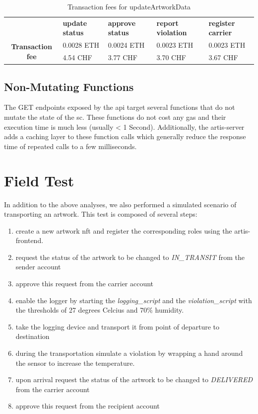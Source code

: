 \begin{table}[ht]
\begin{tabular}{cllll}
                                          & \textbf{update status} & \textbf{approve status} & \textbf{report violation} & \textbf{register carrier} \\ \cline{2-5} 
\multirow{2}{*}{\textbf{Transaction fee}} & 0.0028 ETH             & 0.0024 ETH          & 0.0023 ETH        & 0.0023 ETH       \\
                                          & 4.54 CHF               & 3.77 CHF            & 3.70 CHF          & 3.67 CHF       
\end{tabular}
\caption{Transaction fees for updateArtworkData}
\label{tab:updateArtworkData_tx_fees}
\end{table}


\subsection*{Non-Mutating Functions}
The GET endpoints exposed by the \gls{api} target several functions that do not mutate the state of the \gls{sc}. These functions do not cost any gas and their execution time is much less (usually < 1 Second). Additionally, the artis-server adds a caching layer to these function calls which generally reduce the response time of repeated calls to a few milliseconds. 

\section{Field Test}
In addition to the above analyses, we also performed a simulated scenario of transporting an artwork. This test is composed of several steps:

\begin{enumerate}
    \item create a new artwork \gls{nft} and register the corresponding roles using the artis-frontend.
    \item request the status of the artwork to be changed to \textit{IN\_TRANSIT} from the sender account
    \item approve this request from the carrier account
    \item enable the logger by starting the \textit{logging\_script} and the \textit{violation\_script} with the thresholds of 27 degrees Celcius and 70\% humidity.
    \item take the logging device and transport it from point of departure to destination
    \item during the transportation simulate a violation by wrapping a hand around the sensor to increase the temperature.
    \item upon arrival request the status of the artwork to be changed to \textit{DELIVERED} from the carrier account
    \item approve this request from the recipient account
\end{enumerate}

